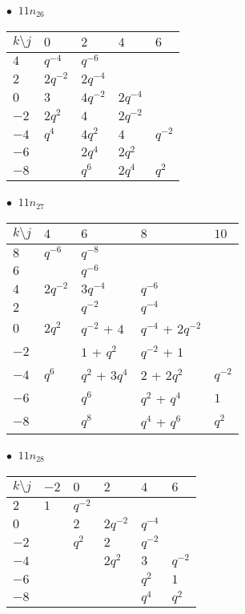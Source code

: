 %
\begin{minipage}{\linewidth}
$\bullet\ $ $11n_{26}$ \vspace{0.5em} \\
\begin{tabular}{l|llll}
$k \setminus j$ & $0$ & $2$ & $4$ & $6$ \\
\hline
$4$ & $q^{-4}$ & $q^{-6}$ &  &  \\
$2$ & $2q^{-2}$ & $2q^{-4}$ &  &  \\
$0$ & $3$ & $4q^{-2}$ & $2q^{-4}$ &  \\
$-2$ & $2q^{2}$ & $4$ & $2q^{-2}$ &  \\
$-4$ & $q^{4}$ & $4q^{2}$ & $4$ & $q^{-2}$ \\
$-6$ &  & $2q^{4}$ & $2q^{2}$ &  \\
$-8$ &  & $q^{6}$ & $2q^{4}$ & $q^{2}$ \\
\end{tabular}
\vspace{2em}
\end{minipage}
%
\begin{minipage}{\linewidth}
$\bullet\ $ $11n_{27}$ \vspace{0.5em} \\
\begin{tabular}{l|llll}
$k \setminus j$ & $4$ & $6$ & $8$ & $10$ \\
\hline
$8$ & $q^{-6}$ & $q^{-8}$ &  &  \\
$6$ &  & $q^{-6}$ &  &  \\
$4$ & $2q^{-2}$ & $3q^{-4}$ & $q^{-6}$ &  \\
$2$ &  & $q^{-2}$ & $q^{-4}$ &  \\
$0$ & $2q^{2}$ & $q^{-2}$ + $4$ & $q^{-4}$ + $2q^{-2}$ &  \\
$-2$ &  & $1$ + $q^{2}$ & $q^{-2}$ + $1$ &  \\
$-4$ & $q^{6}$ & $q^{2}$ + $3q^{4}$ & $2$ + $2q^{2}$ & $q^{-2}$ \\
$-6$ &  & $q^{6}$ & $q^{2}$ + $q^{4}$ & $1$ \\
$-8$ &  & $q^{8}$ & $q^{4}$ + $q^{6}$ & $q^{2}$ \\
\end{tabular}
\vspace{2em}
\end{minipage}
%
\begin{minipage}{\linewidth}
$\bullet\ $ $11n_{28}$ \vspace{0.5em} \\
\begin{tabular}{l|lllll}
$k \setminus j$ & $-2$ & $0$ & $2$ & $4$ & $6$ \\
\hline
$2$ & $1$ & $q^{-2}$ &  &  &  \\
$0$ &  & $2$ & $2q^{-2}$ & $q^{-4}$ &  \\
$-2$ &  & $q^{2}$ & $2$ & $q^{-2}$ &  \\
$-4$ &  &  & $2q^{2}$ & $3$ & $q^{-2}$ \\
$-6$ &  &  &  & $q^{2}$ & $1$ \\
$-8$ &  &  &  & $q^{4}$ & $q^{2}$ \\
\end{tabular}
\vspace{2em}
\end{minipage}
